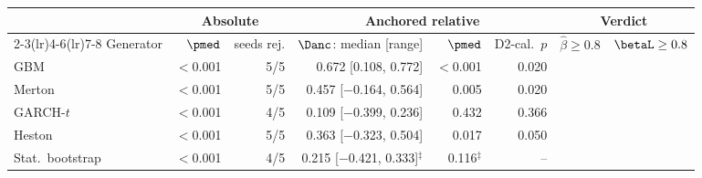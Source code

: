 \begin{tabular}{lrrrrrll}
\toprule
 & \multicolumn{2}{c}{Absolute \WC{}} & \multicolumn{3}{c}{Anchored relative} & \multicolumn{2}{c}{Verdict} \\
\cmidrule(lr){2-3}\cmidrule(lr){4-6}\cmidrule(lr){7-8}
Generator & $\pmed$ & seeds rej. & $\Danc$: median [range] & $\pmed$ & D2-cal.\ $p$ & $\hat\beta\ge0.8$ & $\betaL\ge0.8$ \\
\midrule
GBM & $<$0.001 & 5/5 & 0.672 [0.108, 0.772] & $<$0.001 & 0.020 & \BAD{} & \BAD{} \\
Merton & $<$0.001 & 5/5 & 0.457 [$-$0.164, 0.564] & 0.005 & 0.020 & \BAD{} & \BAD{} \\
GARCH-$t$ & $<$0.001 & 4/5 & 0.109 [$-$0.399, 0.236] & 0.432 & 0.366 & \INCONCL{} & \INCONCL{} \\
Heston & $<$0.001 & 5/5 & 0.363 [$-$0.323, 0.504] & 0.017 & 0.050 & \BAD{} & \BAD{} \\
Stat.\ bootstrap & $<$0.001 & 4/5 & 0.215 [$-$0.421, 0.333]$^{\ddagger}$ & 0.116$^{\ddagger}$ & -- & \INVALID{} & \INVALID{} \\
\bottomrule
\end{tabular}

